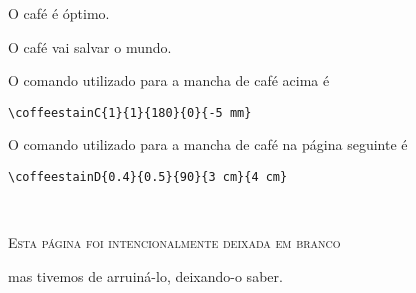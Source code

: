 \documentclass[a4paper, 11pt, BCOR = 0 pt, oneside]{scrartcl}
\begin{document}
O café é óptimo.

\vspace{5mm}

\noindent
O café vai salvar o mundo.

\vfill{}

\begin{tcolorbox}
O comando utilizado para a mancha de café acima é

  \verb|\coffeestainC{1}{1}{180}{0}{-5 mm}|
\end{tcolorbox}

\begin{tcolorbox}
O comando utilizado para a mancha de café na página seguinte é

  \verb|\coffeestainD{0.4}{0.5}{90}{3 cm}{4 cm}|
\end{tcolorbox}

\newpage{}
\pagestyle{empty}
~\\

\label{stainD}

\vfill{}
\begin{center}
\textsc{Esta página foi intencionalmente deixada em branco}

mas tivemos de arruiná-lo, deixando-o saber.
\end{center}

\vfill{}
\end{document}
